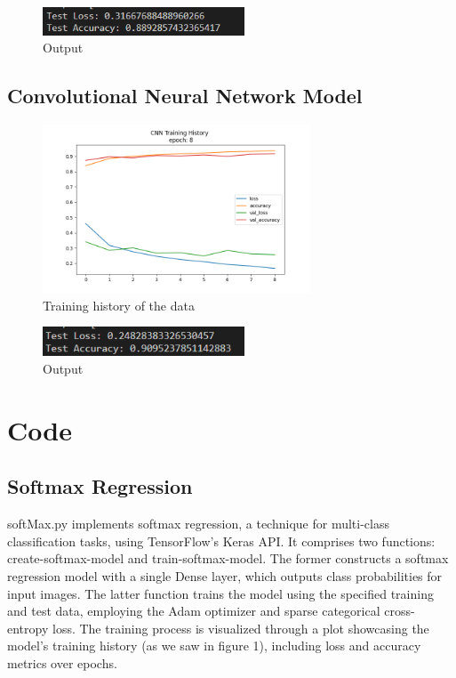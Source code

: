 \documentclass{article}
\begin{document}
\begin{figure}[H]
    \caption{Output}
    \centering
    \includegraphics[width=6cm]{imgFolder/simpleNeuralNetworkResult.png}
\end{figure}

\subsection{Convolutional Neural Network Model}
\begin{figure}[H]
    \caption{Training history of the data}
    \centering
    \includegraphics[width=8cm]{imgFolder/CNN_fig.png}
\end{figure}

\begin{figure}[H]
    \caption{Output}
    \centering
    \includegraphics[width=6cm]{imgFolder/CNNResult.png}
\end{figure}

\newpage
\section{Code}
\subsection{Softmax Regression}
softMax.py implements softmax regression, a technique for multi-class classification tasks, using TensorFlow's Keras API. It comprises two functions: create-softmax-model and train-softmax-model. The former constructs a softmax regression model with a single Dense layer, which outputs class probabilities for input images. The latter function trains the model using the specified training and test data, employing the Adam optimizer and sparse categorical cross-entropy loss. The training process is visualized through a plot showcasing the model's training history (as we saw in figure 1), including loss and accuracy metrics over epochs.
\end{document}
